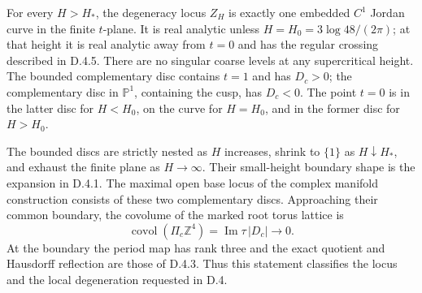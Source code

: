\begin{proposition}\label{push:src:D.4.8}
For every \(H>H_*\), the degeneracy locus \(Z_H\) is exactly one
embedded \(C^1\) Jordan curve in the finite \(t\)-plane. It is
real analytic unless \(H=H_0=3\log48/(2\pi)\); at that height it
is real analytic away from \(t=0\) and has the regular crossing
described in D.4.5. There are no singular coarse levels at any
supercritical height. The bounded complementary disc contains
\(t=1\) and has \(D_c>0\); the complementary disc in
\(\mathbb P^1\), containing the cusp, has \(D_c<0\). The point
\(t=0\) is in the latter disc for \(H<H_0\), on the curve for
\(H=H_0\), and in the former disc for \(H>H_0\).

The bounded discs are strictly nested as \(H\) increases, shrink
to \(\{1\}\) as \(H\downarrow H_*\), and exhaust the finite
plane as \(H\to\infty\). Their small-height boundary shape is
the expansion in D.4.1. The maximal open base locus of the complex
manifold construction consists of these two complementary discs.
Approaching their common boundary, the covolume of the marked
root torus lattice is
\[
 \operatorname{covol}(\Pi_c\mathbb Z^4)
       =\operatorname{Im}\tau\,|D_c|\longrightarrow0.
\]
At the boundary the period map has rank three and the exact quotient
and Hausdorff reflection are those of D.4.3. Thus this statement
classifies the locus and the local degeneration requested in D.4.
\end{proposition}
